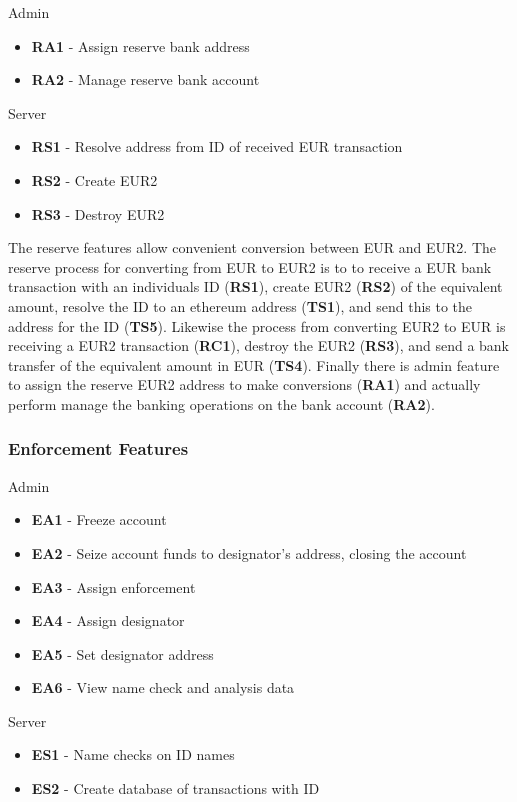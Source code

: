 \documentclass[a4paper,12pt]{article} %
\begin{document}
{{Admin
\begin{itemize}
	\item \textbf{RA1} - Assign reserve bank address
	\item \textbf{RA2} - Manage reserve bank account
\end{itemize}

Server
\begin{itemize}
	\item \textbf{RS1} - Resolve address from ID of received EUR transaction
	\item \textbf{RS2} - Create EUR2
	\item \textbf{RS3} - Destroy EUR2
\end{itemize}

The reserve features allow convenient conversion between EUR and EUR2. The reserve process for converting from EUR to EUR2 is to to receive a EUR bank transaction with an individuals ID (\textbf{RS1}), create EUR2 (\textbf{RS2}) of the equivalent amount, resolve the ID to an ethereum address (\textbf{TS1}), and send this to the address for the ID (\textbf{TS5}).  Likewise the process from converting EUR2 to EUR is receiving a EUR2 transaction (\textbf{RC1}), destroy the EUR2 (\textbf{RS3}), and send a bank transfer of the equivalent amount in EUR (\textbf{TS4}). Finally there is admin feature to assign the reserve EUR2 address to make conversions (\textbf{RA1}) and actually perform manage the banking operations on the bank account (\textbf{RA2}).

\subsubsection{Enforcement Features} \label{sssec:3.3:enforcement}

Admin
\begin{itemize}
	\item \textbf{EA1} - Freeze account
	\item \textbf{EA2} - Seize account funds to designator's address, closing the account
	\item \textbf{EA3} - Assign enforcement
	\item \textbf{EA4} - Assign designator
	\item \textbf{EA5} - Set designator address
	\item \textbf{EA6} - View name check and analysis data
\end{itemize}

Server
\begin{itemize}
	\item \textbf{ES1} - Name checks on ID names
	\item \textbf{ES2} - Create database of transactions with ID
\end{itemize}

}}
\end{document}
